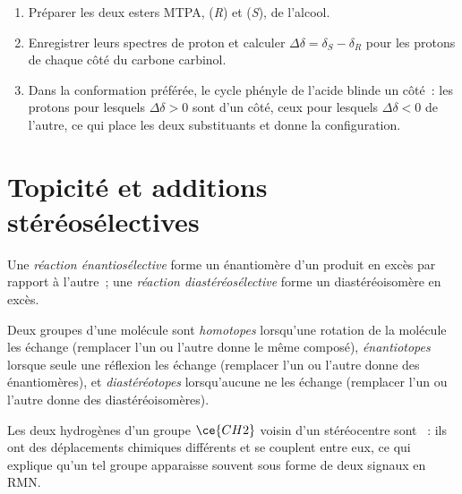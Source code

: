 \begin{method}\label{met:b3:asymmetric-synthesis:mosher}
\begin{enumerate}
  \item Préparer les deux esters MTPA, (\textit{R}) et (\textit{S}), de l'alcool.
  \item Enregistrer leurs spectres de proton et calculer $\Delta\delta = \delta_S - \delta_R$ pour les protons de chaque
        côté du carbone carbinol.
  \item Dans la conformation préférée, le cycle phényle de l'acide blinde
        un côté~:
        les protons pour lesquels $\Delta\delta > 0$ sont d'un côté, ceux pour lesquels $\Delta\delta < 0$ de l'autre, ce qui
        place les deux substituants et donne la configuration.
\end{enumerate}
\end{method}

\section{Topicité et additions stéréosélectives}

\begin{definition}\label{def:b3:asymmetric-synthesis:selective}
Une \emph{réaction énantiosélective} forme un
énantiomère d'un produit en excès par rapport à l'autre~; une \emph{réaction diastéréosélective} forme un diastéréoisomère en excès.
\end{definition}

\begin{definition}[Topicité]\label{def:b3:asymmetric-synthesis:topicity}
Deux groupes d'une molécule sont \emph{homotopes} lorsqu'une
rotation de la molécule les échange (remplacer l'un ou l'autre donne le
même composé), \emph{énantiotopes} lorsque seule une
réflexion les échange (remplacer l'un ou l'autre donne des énantiomères),
et \emph{diastéréotopes} lorsqu'aucune  ne les échange (remplacer l'un ou l'autre donne des
diastéréoisomères).
\end{definition}

Les deux hydrogènes d'un groupe $\ce{CH2}$ voisin d'un stéréocentre sont ~: ils
ont des déplacements chimiques différents et se couplent entre eux, ce qui
explique qu'un tel groupe apparaisse souvent sous forme de deux signaux en
RMN.

